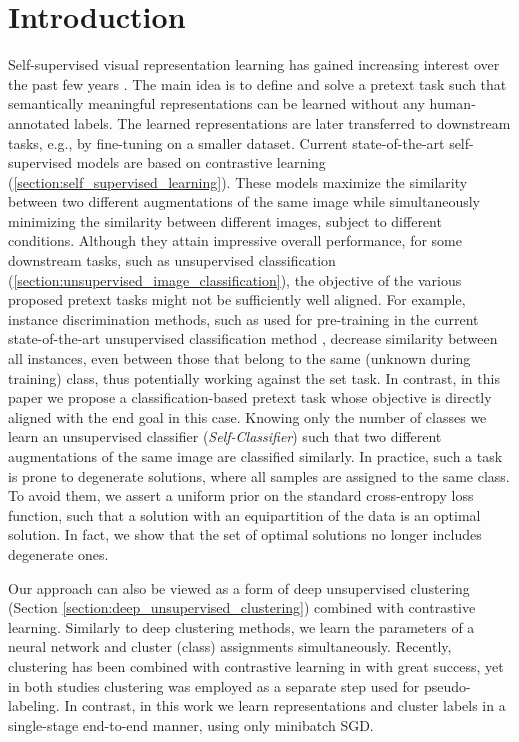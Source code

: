 \documentclass[runningheads]{llncs}
\begin{document}
\section{Introduction}
Self-supervised visual representation learning has gained increasing interest over the past few years \cite{wu2018unsupervised,dosovitskiy2014discriminative,DBLP:journals/corr/abs-2002-05709,chen2020big,he2020momentum,chen2020improved,caron2020unsupervised,misra2020self}. The main idea is to define and solve a pretext task such that semantically meaningful representations can be learned without any human-annotated labels. The learned representations are later transferred to downstream tasks, e.g., by fine-tuning on a smaller dataset. Current state-of-the-art self-supervised models are based on contrastive learning (\cref{section:self_supervised_learning}). These models maximize the similarity between two different augmentations of the same image while simultaneously minimizing the similarity between different images, subject to different conditions.
Although they attain impressive overall performance, for some downstream tasks, such as unsupervised classification (\cref{section:unsupervised_image_classification}), the objective of the various proposed pretext tasks might not be sufficiently well aligned. For example, instance discrimination methods, such as \cite{he2020momentum,chen2020improved} used for pre-training in the current state-of-the-art unsupervised classification method \cite{van2020scan}, decrease similarity between all instances, even between those that belong to the same (unknown during training) class, thus potentially working against the set task. In contrast, in this paper we propose a classification-based pretext task whose objective is directly aligned with the end goal in this case.
Knowing only the number of classes  we learn an unsupervised classifier (\textit{Self-Classifier}) such that two different augmentations of the same image are classified similarly. In practice, such a task is prone to degenerate solutions, where all samples are assigned to the same class. To avoid them, we assert a uniform prior on the standard cross-entropy loss function, such that a solution with an equipartition of the data is an optimal solution. In fact, we show that the set of optimal solutions no longer includes degenerate ones. 

Our approach can also be viewed as a form of deep unsupervised clustering (Section \ref{section:deep_unsupervised_clustering}) \cite{xie2016unsupervised,yang2016joint,chang2017deep,caron2018deep,haeusser2018associative,ji2019invariant,van2020scan,YM.2020Self-labelling} combined with contrastive learning. Similarly to deep clustering methods, we learn the parameters of a neural network and cluster (class) assignments simultaneously. Recently, clustering has been combined with contrastive learning in \cite{YM.2020Self-labelling,caron2020unsupervised} with great success, yet in both studies clustering was employed as a separate step used for pseudo-labeling. In contrast, in this work we learn representations and cluster labels in a single-stage end-to-end manner, using only minibatch SGD.
\end{document}

